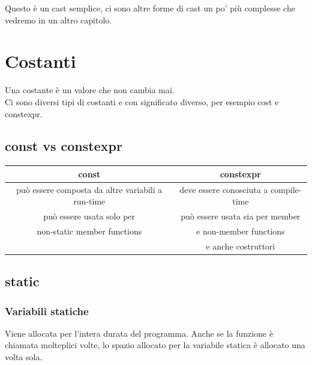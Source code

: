 \textsf{\small Questo è un cast semplice, ci sono altre forme di cast un po' più complesse che vedremo in un altro capitolo.} \\


\newpage

\section{Costanti}

\textsf{\small Una costante è un valore che non cambia mai.}\\

\textsf{\small Ci sono diversi tipi di costanti e con significato diverso, per esempio \color{myblue2} cost \normalcolor e \color{myblue2} constexpr. \normalcolor}\\

\subsection{const vs constexpr}

\begin{tabular}{|c|c|}
	\hline
	\textbf{const} & \textbf{constexpr} \\
	\hline
	\textsf{\small può essere composta da altre variabili a run-time} & \textsf{\small deve essere conosciuta a compile-time} \\
	\textsf{\small può essere usata solo per } & \textsf{\small può essere usata sia per member } \\
	\textsf{\small non-static member functions} & \textsf{\small e non-member functions} \\
	\textsf{\small } & \textsf{\small e anche costruttori} \\
	\hline
\end{tabular}\break

\subsection{static}

\subsubsection{Variabili statiche}

\textsf{\small Viene allocata per l'intera durata del programma. Anche se la funzione è chiamata molteplici volte, lo spazio allocato per la variabile statica è allocato una volta sola.} \\

